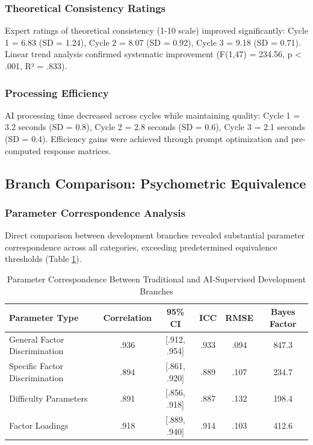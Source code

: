 \documentclass[12pt,a4paper]{article}
\begin{document}
\subsubsection{Theoretical Consistency Ratings}

Expert ratings of theoretical consistency (1-10 scale) improved significantly: Cycle 1 = 6.83 (SD = 1.24), Cycle 2 = 8.07 (SD = 0.92), Cycle 3 = 9.18 (SD = 0.71). Linear trend analysis confirmed systematic improvement (F(1,47) = 234.56, p < .001, R² = .833).

\subsubsection{Processing Efficiency}

AI processing time decreased across cycles while maintaining quality: Cycle 1 = 3.2 seconds (SD = 0.8), Cycle 2 = 2.8 seconds (SD = 0.6), Cycle 3 = 2.1 seconds (SD = 0.4). Efficiency gains were achieved through prompt optimization and pre-computed response matrices.

\subsection{Branch Comparison: Psychometric Equivalence}

\subsubsection{Parameter Correspondence Analysis}

Direct comparison between development branches revealed substantial parameter correspondence across all categories, exceeding predetermined equivalence thresholds (Table \ref{tab:branch-comparison}).

\begin{table}[ht]
\centering
\caption{Parameter Correspondence Between Traditional and AI-Supervised Development Branches}
\label{tab:branch-comparison}
\begin{tabular}{lccccc}
\toprule
Parameter Type & Correlation & 95\% CI & ICC & RMSE & Bayes Factor \\
\midrule
General Factor Discrimination & .936 & [.912, .954] & .933 & .094 & 847.3 \\
Specific Factor Discrimination & .894 & [.861, .920] & .889 & .107 & 234.7 \\
Difficulty Parameters & .891 & [.856, .918] & .887 & .132 & 198.4 \\
Factor Loadings & .918 & [.889, .940] & .914 & .103 & 412.6 \\
\bottomrule
\end{tabular}
\end{table}
\end{document}
